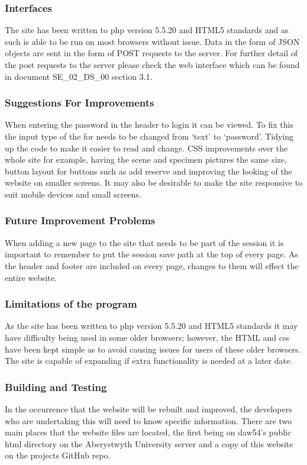     \subsubsection{Interfaces}
        The site has been written to php version 5.5.20 and HTML5 standards and as such is able to be run on most browsers without issue. Data in the form of JSON objects are sent in the form of POST requests to the server. For further detail of the post requests to the server please check the web interface which can be found in document SE\_02\_DS\_00 section 3.1.

    \subsubsection{Suggestions For Improvements}
        When entering the password in the header to login it can be viewed. To fix this the input type of the for needs to be changed from `text' to `password'. Tidying up the code to make it easier to read and change. CSS improvements over the whole site for example, having the scene and specimen pictures the same size, button layout for buttons such as add reserve and improving the looking of the website on smaller screens. It may also be desirable to make the site responsive to suit mobile devices and small screens.
    
    \subsubsection{Future Improvement Problems}
        When adding a new page to the site that needs to be part of the session it is important to remember to put the session save path at the top of every page. As the header and footer are included on every page, changes to them will effect the entire website.

    \subsubsection{Limitations of the program}
        As the site has been written to php version 5.5.20 and HTML5 standards it may have difficulty being used in some older browsers; however, the HTML and css have been kept simple as to avoid causing issues for users of these older browsers. The site is capable of expanding if extra functionality is needed at a later date.

    \subsubsection{Building and Testing}
        In the occurrence that the website will be rebuilt and improved, the developers who are undertaking this will need to know specific information. There are two main places that the website files are located, the first being on daw54's public html directory on the Aberystwyth University server and a copy of this website on the projects GitHub repo. 
    
